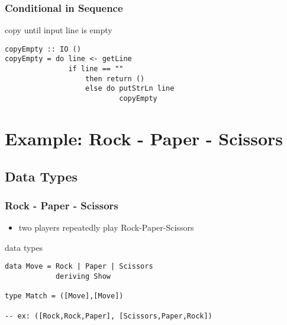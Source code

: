 \documentclass[dvipsnames]{beamer}
\theoremstyle{plain}
\begin{document}
\begin{frame}[fragile]
  \frametitle{Conditional in Sequence}

  \begin{exampleblock}{copy until input line is empty}
    \begin{lstlisting}
copyEmpty :: IO ()
copyEmpty = do line <- getLine
               if line == ""
                   then return ()
                   else do putStrLn line
                           copyEmpty
    \end{lstlisting}
  \end{exampleblock}
\end{frame}

\section{Example: Rock - Paper - Scissors}

\subsection{Data Types}

\begin{frame}[fragile]
  \frametitle{Rock - Paper - Scissors}

  \begin{itemize}
    \item two players repeatedly play Rock-Paper-Scissors
  \end{itemize}

  \begin{exampleblock}{data types}
    \begin{lstlisting}
data Move = Rock | Paper | Scissors
            deriving Show

type Match = ([Move],[Move])

-- ex: ([Rock,Rock,Paper], [Scissors,Paper,Rock])
    \end{lstlisting}
  \end{exampleblock}
\end{frame}
\end{document}
